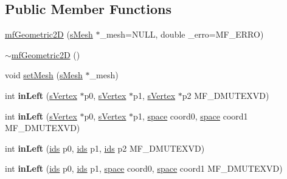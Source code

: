 \subsection*{Public Member Functions}
\begin{DoxyCompactItemize}
\item 
\hyperlink{classmf_1_1mfGeometric2D_aab3e79fbda3e035916b0644feb0dabf3}{mfGeometric2D} (\hyperlink{classmf_1_1mfGeometric2D_a5d9ae6b14eb6f0bad24d9a38567a9466}{sMesh} $\ast$\_\-mesh=NULL, double \_\-erro=MF\_\-ERRO)
\item 
\hyperlink{classmf_1_1mfGeometric2D_a308fe0b20201b12467d0f5e448f3e166}{$\sim$mfGeometric2D} ()
\item 
void \hyperlink{classmf_1_1mfGeometric2D_a6128cc68d2ec4ea6ccd403e7ecccc5fd}{setMesh} (\hyperlink{classmf_1_1mfGeometric2D_a5d9ae6b14eb6f0bad24d9a38567a9466}{sMesh} $\ast$\_\-mesh)
\item 
\hypertarget{classmf_1_1mfGeometric2D_a331ac9205ac8d1a010efe4579fcc7d25}{
int {\bfseries inLeft} (\hyperlink{classmf_1_1mfGeometric2D_ab23d81dfbcc3a52c64efb4857586d9f3}{sVertex} $\ast$p0, \hyperlink{classmf_1_1mfGeometric2D_ab23d81dfbcc3a52c64efb4857586d9f3}{sVertex} $\ast$p1, \hyperlink{classmf_1_1mfGeometric2D_ab23d81dfbcc3a52c64efb4857586d9f3}{sVertex} $\ast$p2 MF\_\-DMUTEXVD)}
\label{classmf_1_1mfGeometric2D_a331ac9205ac8d1a010efe4579fcc7d25}

\item 
\hypertarget{classmf_1_1mfGeometric2D_ac8e2b9dad4a95dba364f228a8686916d}{
int {\bfseries inLeft} (\hyperlink{classmf_1_1mfGeometric2D_ab23d81dfbcc3a52c64efb4857586d9f3}{sVertex} $\ast$p0, \hyperlink{classmf_1_1mfGeometric2D_ab23d81dfbcc3a52c64efb4857586d9f3}{sVertex} $\ast$p1, \hyperlink{classmf_1_1mfGeometric2D_a6e4fccf14c9c28a5be638f0254b5af07}{space} coord0, \hyperlink{classmf_1_1mfGeometric2D_a6e4fccf14c9c28a5be638f0254b5af07}{space} coord1 MF\_\-DMUTEXVD)}
\label{classmf_1_1mfGeometric2D_ac8e2b9dad4a95dba364f228a8686916d}

\item 
\hypertarget{classmf_1_1mfGeometric2D_ab71cb72e5f724839f20adbc37568a62d}{
int {\bfseries inLeft} (\hyperlink{classmf_1_1mfGeometric2D_a1a86a0d9076b7362d928c25126d18b7b}{ids} p0, \hyperlink{classmf_1_1mfGeometric2D_a1a86a0d9076b7362d928c25126d18b7b}{ids} p1, \hyperlink{classmf_1_1mfGeometric2D_a1a86a0d9076b7362d928c25126d18b7b}{ids} p2 MF\_\-DMUTEXVD)}
\label{classmf_1_1mfGeometric2D_ab71cb72e5f724839f20adbc37568a62d}

\item 
\hypertarget{classmf_1_1mfGeometric2D_aef3aa378ba229d921239b04bddac1d90}{
int {\bfseries inLeft} (\hyperlink{classmf_1_1mfGeometric2D_a1a86a0d9076b7362d928c25126d18b7b}{ids} p0, \hyperlink{classmf_1_1mfGeometric2D_a1a86a0d9076b7362d928c25126d18b7b}{ids} p1, \hyperlink{classmf_1_1mfGeometric2D_a6e4fccf14c9c28a5be638f0254b5af07}{space} coord0, \hyperlink{classmf_1_1mfGeometric2D_a6e4fccf14c9c28a5be638f0254b5af07}{space} coord1 MF\_\-DMUTEXVD)}
\label{classmf_1_1mfGeometric2D_aef3aa378ba229d921239b04bddac1d90}


\end{DoxyCompactItemize}
